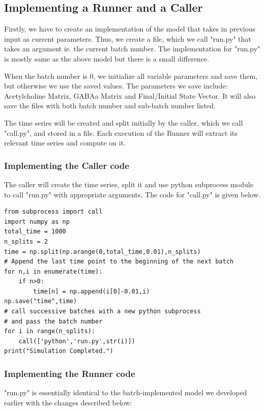\documentclass[10pt,letterpaper]{article}
\begin{document}
\subsection*{Implementing a Runner and a Caller}

Firstly, we have to create an implementation of the model that takes in previous input as current parameters. Thus, we create a file, which we call "run.py" that takes an argument ie. the current batch number. The implementation for "run.py" is mostly same as the above model but there is a small difference.

When the batch number is 0, we initialize all variable parameters and save them, but otherwise we use the saved values. The parameters we save include: Acetylcholine Matrix, GABAa Matrix and Final/Initial State Vector. It will also save the files with both batch number and sub-batch number listed.

The time series will be created and split initially by the caller, which we call "call.py", and stored in a file. Each execution of the Runner will extract its relevant time series and compute on it.

\subsubsection*{Implementing the Caller code}

The caller will create the time series, split it and use python subprocess module to call "run.py" with appropriate arguments. The code for "call.py" is given below.

\begin{verbatim}
from subprocess import call
import numpy as np
total_time = 1000
n_splits = 2
time = np.split(np.arange(0,total_time,0.01),n_splits)
# Append the last time point to the beginning of the next batch
for n,i in enumerate(time):
    if n>0:
        time[n] = np.append(i[0]-0.01,i)
np.save("time",time)
# call successive batches with a new python subprocess 
# and pass the batch number
for i in range(n_splits):
    call(['python','run.py',str(i)])
print("Simulation Completed.")
\end{verbatim}

\subsubsection*{Implementing the Runner code}

"run.py" is essentially identical to the batch-implemented model we developed earlier with the changes described below:
\end{document}
